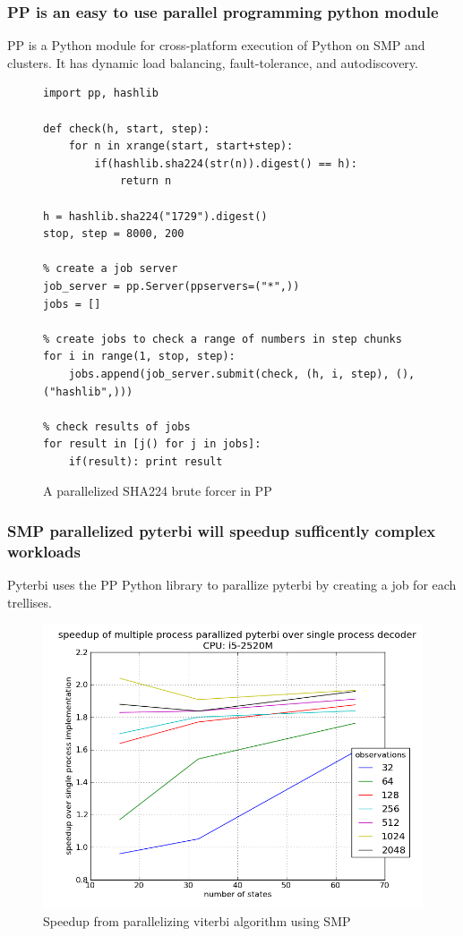\documentclass{beamer}
\begin{document}
\begin{frame}[fragile]
\frametitle{PP is an easy to use parallel programming python module}
PP is a Python module for cross-platform execution of Python on SMP and clusters. It has dynamic load balancing, fault-tolerance, and autodiscovery. 

\begin{figure}
\tiny
\begin{lstlisting}
import pp, hashlib 

def check(h, start, step):
    for n in xrange(start, start+step):
        if(hashlib.sha224(str(n)).digest() == h):
            return n

h = hashlib.sha224("1729").digest()
stop, step = 8000, 200

% create a job server
job_server = pp.Server(ppservers=("*",))
jobs = []

% create jobs to check a range of numbers in step chunks
for i in range(1, stop, step):
    jobs.append(job_server.submit(check, (h, i, step), (), ("hashlib",)))

% check results of jobs
for result in [j() for j in jobs]:
    if(result): print result

\end{lstlisting}
\caption{A parallelized SHA224 brute forcer in PP} 
\end{figure}
\end{frame}

   
    \begin{frame}
        \frametitle{SMP parallelized pyterbi will speedup sufficently complex workloads}
        Pyterbi uses the PP Python library to parallize pyterbi by creating a job for each trellises. 
        \begin{figure}
            \includegraphics[width=.8\textwidth]{figures/speedupgraphhost.png}
            \caption{Speedup from parallelizing viterbi algorithm using SMP}
        \end{figure}

    \end{frame}
    
\end{document}
